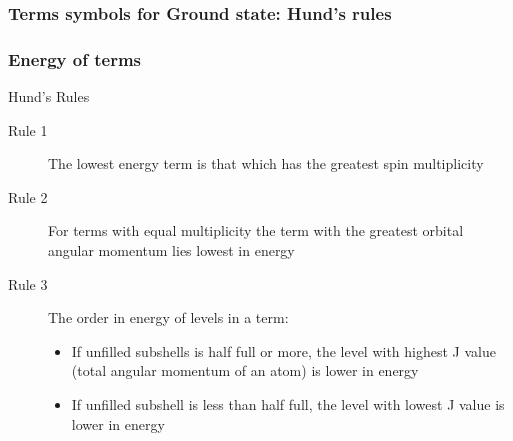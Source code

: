 \documentclass[a4paper,titlepage]{article}
\begin{document}
\subsubsection{Terms symbols for Ground state: Hund's rules}

\begin{frame}
\frametitle{Energy of terms}
\begin{alertblock}{Hund's Rules}
\begin{description}
\item[Rule 1] The lowest energy term is that which has the greatest spin multiplicity
\item[Rule 2] For terms with equal multiplicity the term with the greatest orbital angular momentum lies lowest in energy
\item[Rule 3] The order in energy of levels in a term:
\begin{itemize}
\item If unfilled subshells is half full or more, the level with highest J value (total angular momentum of an atom) is lower in energy
\item If unfilled subshell is less than half full, the level with lowest J value is lower in energy
\end{itemize}
\end{description}
\end{alertblock}
\end{frame}
\end{document}
